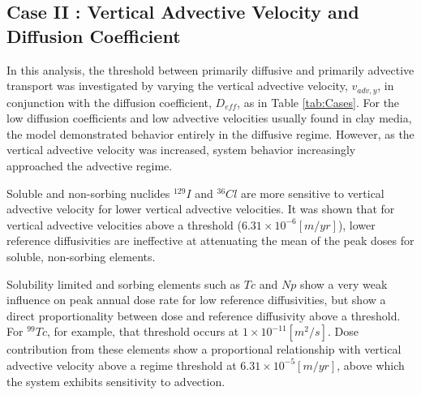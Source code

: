 \subsection{Case II : Vertical Advective Velocity and Diffusion Coefficient}

In this analysis, the threshold between primarily diffusive and primarily 
advective transport was investigated by varying the vertical advective velocity, 
$v_{adv,y}$, in conjunction with the diffusion coefficient, $D_{eff}$, as in 
Table \ref{tab:Cases}.
For the low diffusion coefficients and low advective 
velocities usually found in clay media, the model demonstrated behavior entirely 
in the diffusive regime. However, as the vertical advective velocity was 
increased, system behavior increasingly approached the advective regime. 

Soluble and non-sorbing nuclides $^{129}I$ and 
$^{36}Cl$ are more sensitive to vertical advective velocity for lower vertical 
advective velocities. It was shown that for vertical advective velocities 
above a threshold ($6.31\times10^{-6}[m/yr]$), lower reference diffusivities are 
ineffective at attenuating the mean of the peak doses for soluble, non-sorbing 
elements. 

Solubility limited and sorbing elements such as $Tc$ and $Np$ show a very weak 
influence on peak annual dose rate for low reference diffusivities, but show a 
direct proportionality between dose and reference diffusivity above a threshold. 
For $^{99}Tc$, for example, that threshold occurs at $1\times10^{-11}[m^2/s]$.  
Dose contribution from these elements show a proportional 
relationship with vertical advective velocity above a regime threshold at 
$6.31\times10^{-5}[m/yr]$, above which the system exhibits sensitivity to 
advection. 

